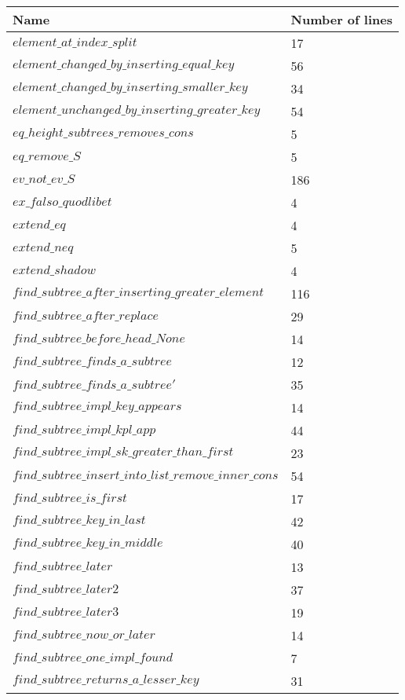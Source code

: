 \newpage
\begin{tabular}{| l | l |}
\hline
Name & Number of lines \\ \hline
$element\_at\_index\_split$ & 17 \\ \hline
$element\_changed\_by\_inserting\_equal\_key$ & 56 \\ \hline
$element\_changed\_by\_inserting\_smaller\_key$ & 34 \\ \hline
$element\_unchanged\_by\_inserting\_greater\_key$ & 54 \\ \hline
$eq\_height\_subtrees\_removes\_cons$ & 5 \\ \hline
$eq\_remove\_S$ & 5 \\ \hline
$ev\_not\_ev\_S$ & 186 \\ \hline
$ex\_falso\_quodlibet$ & 4 \\ \hline
$extend\_eq$ & 4 \\ \hline
$extend\_neq$ & 5 \\ \hline
$extend\_shadow$ & 4 \\ \hline
$find\_subtree\_after\_inserting\_greater\_element$ & 116 \\ \hline
$find\_subtree\_after\_replace$ & 29 \\ \hline
$find\_subtree\_before\_head\_None$ & 14 \\ \hline
$find\_subtree\_finds\_a\_subtree$ & 12 \\ \hline
$find\_subtree\_finds\_a\_subtree'$ & 35 \\ \hline
$find\_subtree\_impl\_key\_appears$ & 14 \\ \hline
$find\_subtree\_impl\_kpl\_app$ & 44 \\ \hline
$find\_subtree\_impl\_sk\_greater\_than\_first$ & 23 \\ \hline
$find\_subtree\_insert\_into\_list\_remove\_inner\_cons$ & 54 \\ \hline
$find\_subtree\_is\_first$ & 17 \\ \hline
$find\_subtree\_key\_in\_last$ & 42 \\ \hline
$find\_subtree\_key\_in\_middle$ & 40 \\ \hline
$find\_subtree\_later$ & 13 \\ \hline
$find\_subtree\_later2$ & 37 \\ \hline
$find\_subtree\_later3$ & 19 \\ \hline
$find\_subtree\_now\_or\_later$ & 14 \\ \hline
$find\_subtree\_one\_impl\_found$ & 7 \\ \hline
$find\_subtree\_returns\_a\_lesser\_key$ & 31 \\ \hline

\end{tabular}
